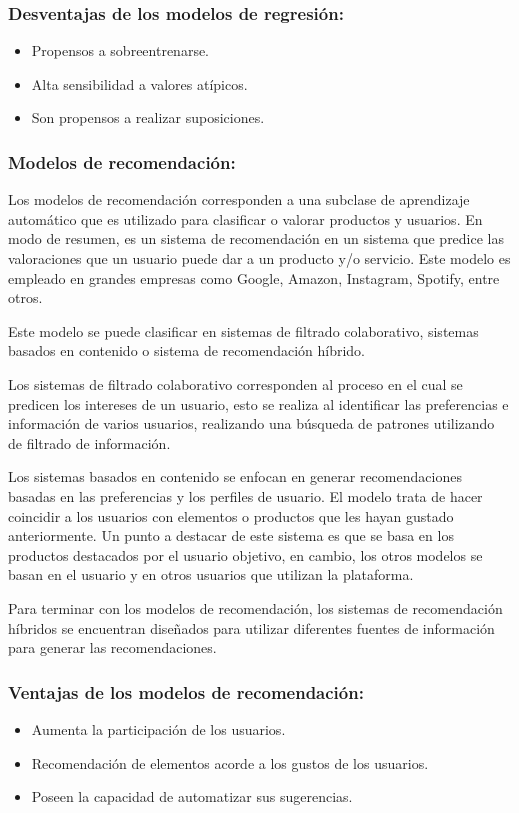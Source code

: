 \subsubsection{Desventajas de los modelos de regresión:}

\begin{itemize}
    \item Propensos a sobreentrenarse.
    \item Alta sensibilidad a valores atípicos.
    \item Son propensos a realizar suposiciones.
\end{itemize}

\subsubsection{Modelos de recomendación:}
Los modelos de recomendación corresponden a una subclase de aprendizaje automático que es utilizado para clasificar o valorar productos y usuarios. En modo de resumen, es un sistema de recomendación en un sistema que predice las valoraciones que un usuario puede dar a un producto y/o servicio. Este modelo es empleado en grandes empresas como Google, Amazon, Instagram, Spotify, entre otros.

Este modelo se puede clasificar en sistemas de filtrado colaborativo, sistemas basados en contenido o sistema de recomendación híbrido.

Los sistemas de filtrado colaborativo corresponden al proceso en el cual se predicen los intereses de un usuario, esto se realiza al identificar las preferencias e información de varios usuarios, realizando una búsqueda de patrones utilizando de filtrado de información.

Los sistemas basados en contenido se enfocan en generar recomendaciones basadas en las preferencias y los perfiles de usuario. El modelo trata de hacer coincidir a los usuarios con elementos o productos que les hayan gustado anteriormente. Un punto a destacar de este sistema es que se basa en los productos destacados por el usuario objetivo, en cambio, los otros modelos se basan en el usuario y en otros usuarios que utilizan la plataforma.

Para terminar con los modelos de recomendación, los sistemas de recomendación híbridos se encuentran diseñados para utilizar diferentes fuentes de información para generar las recomendaciones. 

\subsubsection{Ventajas de los modelos de recomendación:}
\begin{itemize}
    \item Aumenta la participación de los usuarios.
    \item Recomendación de elementos acorde a los gustos de los usuarios.
    \item Poseen la capacidad de automatizar sus sugerencias.
\end{itemize}

